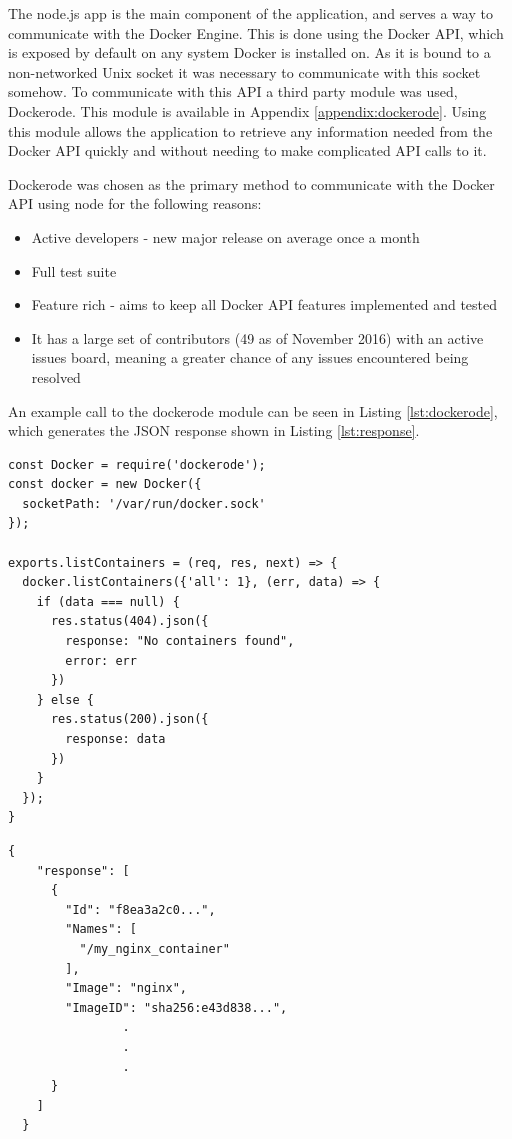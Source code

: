 The node.js app is the main component of the application, and serves a way to communicate with the Docker Engine. This is done using the Docker API, which is exposed by default on any system Docker is installed on. As it is bound to a non-networked Unix socket it was necessary to communicate with this socket somehow. To communicate with this API a third party module was used, Dockerode. This module is available in Appendix \ref{appendix:dockerode}. Using this module allows the application to retrieve any information needed from the Docker API quickly and without needing to make complicated API calls to it. 

Dockerode was chosen as the primary method to communicate with the Docker API using node for the following reasons:

\begin{itemize}
	\item Active developers - new major release on average once a month
	\item Full test suite
	\item Feature rich - aims to keep all Docker API features implemented and tested
	\item It has a large set of contributors (49 as of November 2016) with an active issues board, meaning a greater chance of any issues encountered being resolved
\end{itemize}

An example call to the dockerode module can be seen in Listing \ref{lst:dockerode}, which generates the JSON response shown in Listing \ref{lst:response}.

\begin{lstlisting}[caption={Listing All Containers on a Host},label={lst:dockerode}]
const Docker = require('dockerode');
const docker = new Docker({
  socketPath: '/var/run/docker.sock'
});

exports.listContainers = (req, res, next) => {
  docker.listContainers({'all': 1}, (err, data) => {
    if (data === null) {
      res.status(404).json({
        response: "No containers found",
        error: err
      })
    } else {
      res.status(200).json({
        response: data
      })
    }
  });
}
\end{lstlisting}

\begin{lstlisting}[caption={Response From Server},label={lst:response}]
  {
    "response": [
      {
        "Id": "f8ea3a2c0...",
        "Names": [
          "/my_nginx_container"
        ],
        "Image": "nginx",
        "ImageID": "sha256:e43d838...",
                .
                .
                .
      }
    ]
  }
\end{lstlisting}

